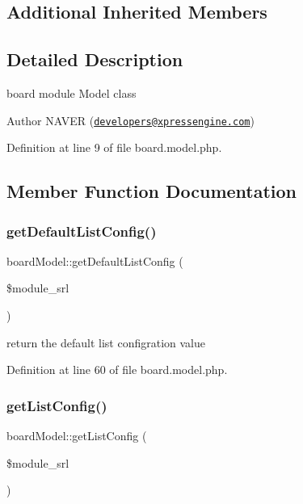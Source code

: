 \subsection*{Additional Inherited Members}


\subsection{Detailed Description}
board module Model class 

\begin{DoxyAuthor}{Author}
N\+A\+V\+ER (\href{mailto:developers@xpressengine.com}{\tt developers@xpressengine.\+com}) 
\end{DoxyAuthor}


Definition at line 9 of file board.\+model.\+php.



\subsection{Member Function Documentation}
\hypertarget{classboardModel_ac4e077b35257fffc1dc3af0a771f20fa}{}\label{classboardModel_ac4e077b35257fffc1dc3af0a771f20fa} 
\subsubsection{\texorpdfstring{get\+Default\+List\+Config()}{getDefaultListConfig()}}
{\footnotesize\ttfamily board\+Model\+::get\+Default\+List\+Config (\begin{DoxyParamCaption}\item[{}]{\$module\+\_\+srl }\end{DoxyParamCaption})}



return the default list configration value 



Definition at line 60 of file board.\+model.\+php.

\hypertarget{classboardModel_acbcd8af2157f310556985b8c720969ab}{}\label{classboardModel_acbcd8af2157f310556985b8c720969ab} 
\subsubsection{\texorpdfstring{get\+List\+Config()}{getListConfig()}}
{\footnotesize\ttfamily board\+Model\+::get\+List\+Config (\begin{DoxyParamCaption}\item[{}]{\$module\+\_\+srl }\end{DoxyParamCaption})}




